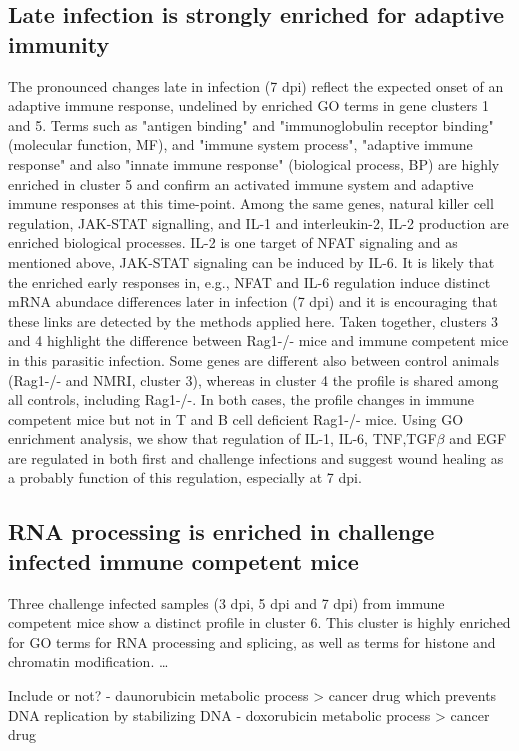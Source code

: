 \documentclass{bmcart}
\begin{document}
\subsection*{Late infection is strongly enriched for adaptive immunity} 
The pronounced changes late in infection (7 dpi) reflect the expected onset of an adaptive immune response, undelined by enriched GO terms in gene clusters 1 and 5. Terms such as "antigen binding" and "immunoglobulin receptor binding" (molecular function, MF), and "immune system process", "adaptive immune response" and also "innate immune response" (biological process, BP) are highly enriched in cluster 5 and confirm an activated immune system and adaptive immune responses at this time-point. Among the same genes, natural killer cell regulation, JAK-STAT signalling, and IL-1 and interleukin-2, IL-2 production are enriched biological processes. IL-2 is one target of NFAT signaling and as mentioned above, JAK-STAT signaling can be induced by IL-6. It is likely that the enriched early responses in, e.g., NFAT and IL-6 regulation induce distinct mRNA abundace differences later in infection (7 dpi) and it is encouraging that these links are detected by the methods applied here. Taken together, clusters 3 and 4 highlight the difference between Rag1-/- mice and immune competent mice in this parasitic infection. Some genes are different also between control animals (Rag1-/- and NMRI, cluster 3), whereas in cluster 4 the profile is shared among all controls, including Rag1-/-. In both cases, the profile changes in immune competent mice but not in T and B cell deficient Rag1-/- mice. Using GO enrichment analysis, we show that regulation of IL-1, IL-6, TNF,TGF$\beta$ and EGF are regulated in both first and challenge infections and suggest wound healing as a probably function of this regulation, especially at 7 dpi.
 
\subsection*{RNA processing is enriched in challenge infected immune competent mice} 
Three challenge infected samples (3 dpi, 5 dpi and 7 dpi) from immune competent mice show a distinct profile in cluster 6. This cluster is highly enriched for GO terms for RNA processing and splicing, as well as terms for histone and chromatin modification. \ldots

Include or not?
- daunorubicin metabolic process > cancer drug which prevents DNA replication by stabilizing DNA
- doxorubicin metabolic process  > cancer drug
\end{document}
